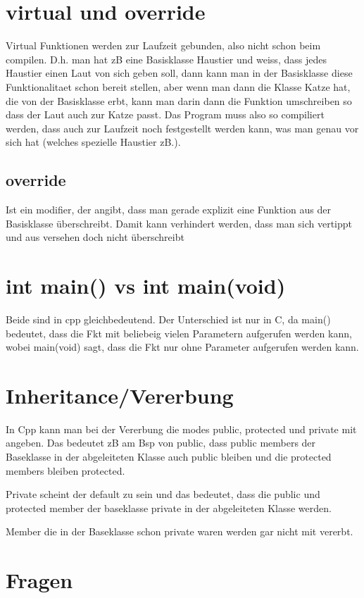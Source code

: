 \documentclass[paper=a4,10pt]{scrartcl}
\begin{document}
\section{virtual und override}
Virtual Funktionen werden zur Laufzeit gebunden, also nicht schon beim compilen. D.h. man hat zB eine Basisklasse Haustier und weiss, dass jedes Haustier einen Laut von sich geben soll, dann kann man in der Basisklasse diese Funktionalitaet schon bereit stellen, aber wenn man dann die Klasse Katze hat, die von der Basisklasse erbt, kann man darin dann die Funktion umschreiben so dass der Laut auch zur Katze passt.
Das Program muss also so compiliert werden, dass auch zur Laufzeit noch festgestellt werden kann, was man genau vor sich hat (welches spezielle Haustier zB.).

\subsection{override}
Ist ein modifier, der angibt, dass man gerade explizit eine Funktion aus der Basisklasse überschreibt. Damit kann verhindert werden, dass man sich vertippt und aus versehen doch nicht überschreibt

\section{int main() vs int main(void)}
Beide sind in cpp gleichbedeutend. Der Unterschied ist nur in C, da main() bedeutet, dass die Fkt mit beliebeig vielen Parametern aufgerufen werden kann, wobei main(void) sagt, dass die Fkt nur ohne Parameter aufgerufen werden kann.

\section{Inheritance/Vererbung}
In Cpp kann man bei der Vererbung die modes public, protected und private mit angeben. Das bedeutet zB am Bsp von public, dass public members der Baseklasse in der abgeleiteten Klasse auch public bleiben und die protected members bleiben protected.

Private scheint der default zu sein und das bedeutet, dass die public und protected member der baseklasse private in der abgeleiteten Klasse werden.

Member die in der Baseklasse schon private waren werden gar nicht mit vererbt.


\section{Fragen}
\end{document}
